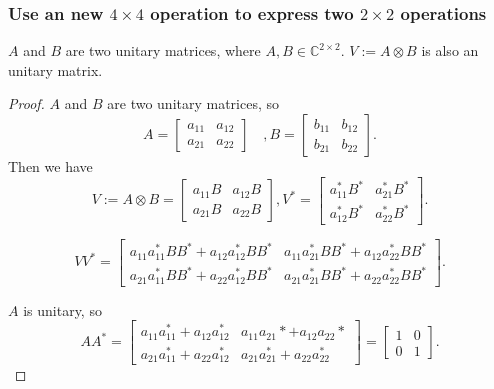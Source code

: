\subsubsection{Use an new $4\times4$ operation to express two $2\times2$ operations}
\begin{property}\label{property_2}
    $A$ and $B$ are two unitary matrices, where $A, B\in \mathbb{C}^{2\times2}$. $V:=A\otimes B$ is also an unitary matrix. 
\end{property}
\begin{proof}
$A$ and $B$ are two unitary matrices, so
\begin{equation}
    A=\left[\begin{array}{ll}
    a_{11} & a_{12} \\
    a_{21} & a_{22}
    \end{array}\right] \quad, B=\left[\begin{array}{ll}
    b_{11} & b_{12} \\
    b_{21} & b_{22}
    \end{array}\right].
\end{equation}
Then we have 
\begin{equation}
V:=A \otimes B=\left[\begin{array}{ll}
a_{11} B & a_{12} B \\
a_{21} B & a_{22} B
\end{array}\right], 
V^*=\left[\begin{array}{ll}
a_{11}^* B^* & a_{21}^* B^* \\
a_{12}^* B^* & a_{22}^* B^*
\end{array}\right].
\end{equation}

\begin{equation}
V V^*=\left[\begin{array}{ll}
a_{11} a_{11}^* B B^*+a_{12} a_{12}^* B B^* & a_{11} a_{21}^* B B^*+a_{12} a_{22}^* B B^* \\
a_{21} a_{11}^* B B^*+a_{22} a_{12}^* B B^* & a_{21} a_{21}^* B B^*+a_{22} a_{22}^* B B^*
\end{array}\right].
\end{equation}




$A$ is unitary, so
\begin{equation}
A A^*=\left[\begin{array}{ll}
a_{11} a_{11}^*+a_{12} a_{12}^* & a_{11} a_{21} *+a_{12} a_{22} * \\
a_{21} a_{11}^*+a_{22} a_{12}^* & a_{21} a_{21}^*+a_{22} a_{22}^*
\end{array}\right]=\left[\begin{array}{ll}
1 & 0 \\
0 & 1
\end{array}\right].
\end{equation}


\end{proof}
